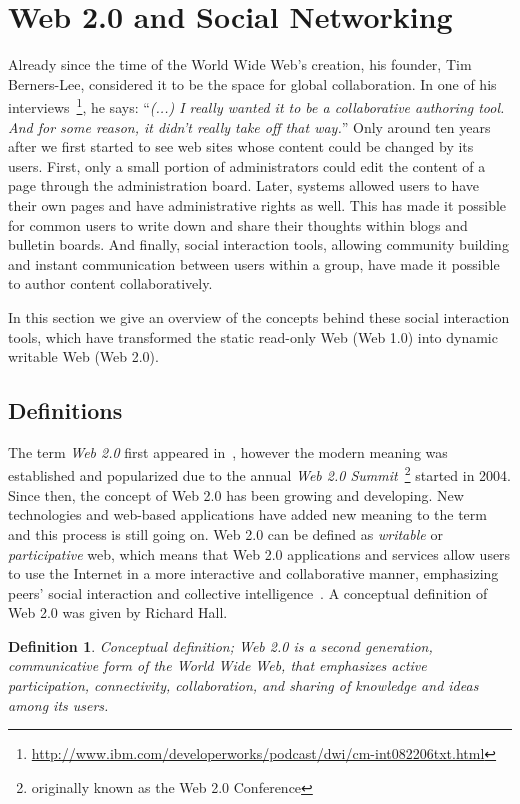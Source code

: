 \documentclass[PhD, Submit, ngerman,UKenglish,table]{scrbook}
\newtheorem{definition}{Definition}
\begin{document}
\section{Web 2.0 and Social Networking}

Already since the time of the World Wide Web's creation, his founder, Tim Berners-Lee, considered it to be the space for global collaboration.
In one of his interviews~\footnote{\url{http://www.ibm.com/developerworks/podcast/dwi/cm-int082206txt.html}}, he says: ``\emph{(...) I really wanted it to be a collaborative authoring tool. And for some reason, it didn't really take off that way.}''
Only around ten years after we first started to see web sites whose content could be changed by its users.
First, only a small portion of administrators could edit the content of a page through the administration board.
Later, systems allowed users to have their own pages and have administrative rights as well.
This has made it possible for common users to write down and share their thoughts within blogs and bulletin boards.
And finally, social interaction tools, allowing community building and instant communication between users within a group, have made it possible to author content collaboratively.

In this section we give an overview of the concepts behind these social interaction tools, which have transformed the static read-only Web (Web 1.0) into dynamic writable Web (Web 2.0).

\subsection{Definitions}

The term \emph{Web 2.0} first appeared in~\cite{dinucci1999fragmented}, however the modern meaning was established and popularized due to the annual \emph{Web 2.0 Summit}~\footnote{originally known as the Web 2.0 Conference} started in 2004.
Since then, the concept of Web 2.0 has been growing and developing.
New technologies and web-based applications have added new meaning to the term and this process is still going on.
Web 2.0 can be defined as \emph{writable} or \emph{participative} web, which means that Web 2.0 applications and services allow users to use the Internet in a more interactive and collaborative manner, emphasizing peers' social interaction and collective intelligence~\cite{murugesan2007understanding}.
A conceptual definition of Web 2.0 was given by Richard Hall.~\cite{hall2009towards}
\begin{definition}{Conceptual definition}; Web 2.0 is a second generation, communicative form of the World Wide Web, that emphasizes active participation, connectivity, collaboration, and sharing of knowledge and ideas among its users.
\end{definition}
\end{document}
